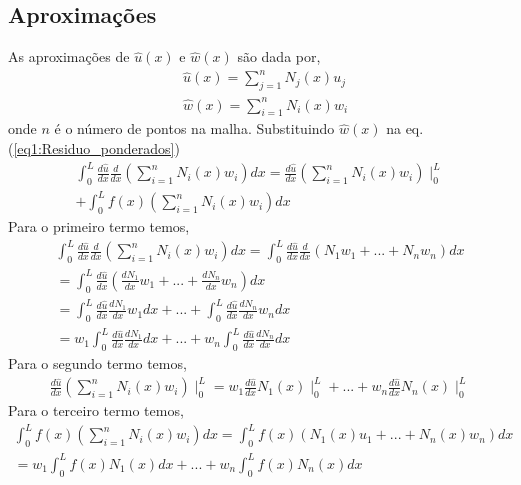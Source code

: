 \subsection{Aproximações}
%
As aproximações de $\hat u(x)$ e $\hat w(x)$ são dada por,
%
\begin{align}
	&\hat u(x) = \sum_{j = 1}^n N_j(x) u_j\\
	&\hat w(x) = \sum_{i = 1}^n N_i(x) w_i
\end{align}
%
onde $n$ é o número de pontos na malha. Substituindo $\hat w(x)$ na eq. (\ref{eq1:Residuo_ponderados})
%
\begin{equation}
\begin{split}
	\int_0^L \frac{d \hat u}{dx} \frac{d}{dx} \left(\sum_{i = 1}^n N_i(x) w_i\right) dx = \frac{d \hat u}{dx} \left(\sum_{i = 1}^n N_i(x) w_i\right) \mid_0^L  \\ + \int_0^L f(x)\left(\sum_{i = 1}^n N_i(x) w_i\right) dx
\end{split}
\end{equation}
%
Para o primeiro termo temos,
%
\begin{equation}
\begin{split}
	\int_0^L \frac{d \hat u}{dx} \frac{d}{dx} \left(\sum_{i = 1}^n N_i(x) w_i\right) dx =	\int_0^L \frac{d \hat u}{dx}  \frac{d}{dx} \left( N_1 w_1 + ... + N_n w_n \right) dx\\
	=\int_0^L \frac{d \hat u}{dx}  \left( \frac{dN_1}{dx} w_1 + ... + \frac{dN_n}{dx} w_n \right) dx\\
	=\int_0^L \frac{d \hat u}{dx}  \frac{dN_1}{dx} w_1 dx + ... + \int_0^L \frac{d \hat u}{dx}  \frac{dN_n}{dx} w_n dx\\
	=w_1 \int_0^L \frac{d \hat u}{dx}  \frac{dN_1}{dx} dx + ... + w_n \int_0^L \frac{d \hat u}{dx}  \frac{dN_n}{dx}  dx
\end{split}
\label{eq1:p_termo}
\end{equation}
%
Para o segundo termo temos,
%
\begin{equation}
	\begin{split}
	\frac{d \hat u}{dx} \left(\sum_{i = 1}^n N_i(x) w_i\right) \mid_0^L = w_1  \frac{d \hat u}{dx} N_1(x) \mid_0^L + ... + w_n \frac{d \hat u}{dx} N_n(x) \mid_0^L
	\end{split}
\label{eq1:s_termo}
\end{equation}
%
Para o terceiro termo temos,
%
\begin{equation}
	\begin{split}
		\int_0^L f(x)\left(\sum_{i = 1}^n N_i(x) w_i\right) dx = \int_0^L f(x)\left(N_1(x) u_1 + ... + N_n(x) w_n\right) dx\\
		= w_1 \int_0^L f(x) N_1(x) dx + ... + w_n \int_0^L f(x) N_n(x) dx
	\end{split}
\label{eq1:t_termo}
\end{equation}

